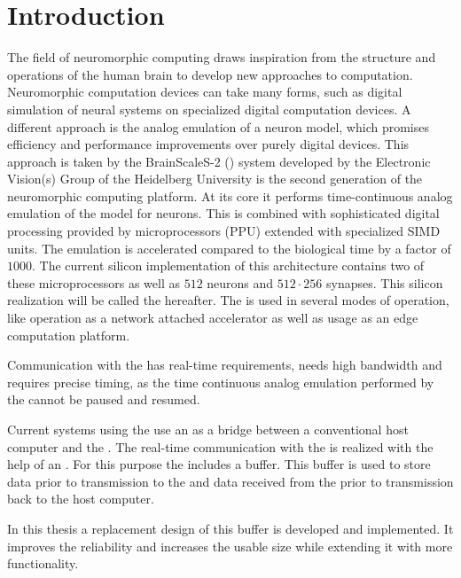 \section{Introduction}
The field of neuromorphic computing draws inspiration from the structure and operations of the human brain to develop new approaches to computation. Neuromorphic computation devices can take many forms, such as digital simulation of neural systems on specialized digital computation devices\autocite{ref:spinnaker}. A different approach is the analog emulation of a neuron model, which promises efficiency and performance improvements over purely digital devices. This approach is taken by the BrainScaleS-2 (\BSSTwo{}) system\autocite{ref:bss2hw} developed by the Electronic Vision(s) Group of the Heidelberg University is the second generation of the \BSS{} neuromorphic computing platform. At its core it performs time-continuous analog emulation of the \AdEx{}\autocite{ref:adex} model for neurons. This is combined with sophisticated digital processing provided by microprocessors (PPU) extended with specialized SIMD units. The emulation is accelerated compared to the biological time by a factor of $\num{1000}$. The current silicon implementation of this architecture contains two of these microprocessors as well as $\num{512}$ neurons and $\num{512} · \num{256}$ synapses. This silicon realization will be called the \HICANNX{} hereafter. The \HICANNX{} is used in several modes of operation, like operation as a network attached accelerator\autocite{ref:network_accelerator} as well as usage as an edge computation platform\autocite{ref:mobile_system}.

Communication with the \HICANNX{} has real-time requirements, needs high bandwidth and requires precise timing, as the time continuous analog emulation performed by the \ASIC{} cannot be paused and resumed.

Current systems using the \HICANNX{} use an \FPGA{} as a bridge between a conventional host computer and the \ASIC{}. The real-time communication with the \ASIC{} is realized with the help of an \FPGA{}. For this purpose the \FPGA{} includes a buffer. This buffer is used to store data prior to transmission to the \ASIC{} and data received from the \ASIC{} prior to transmission back to the host computer.

In this thesis a replacement design of this buffer is developed and implemented. It improves the reliability and increases the usable size while extending it with more functionality.
